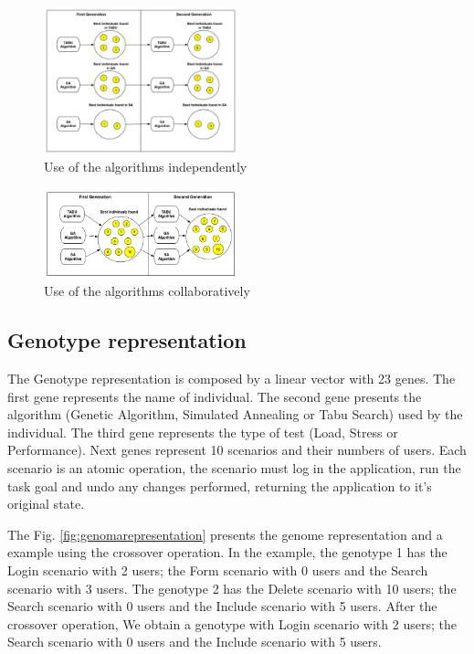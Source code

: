 \begin{figure}[h]
\includegraphics[width=0.5\textwidth]{./images/independ.png}
\caption{Use of the algorithms independently}
\label{fig:firstaproach}
\end{figure}
\begin{figure}
\includegraphics[width=0.5\textwidth]{./images/collaborative.png}
\caption{Use of the  algorithms collaboratively}
\label{fig:secondapproach}
\end{figure}

\subsection{Genotype representation}

The Genotype representation is composed by a linear vector with 23 genes. The first gene represents the name of individual. The second gene presents the  algorithm (Genetic Algorithm, Simulated Annealing or Tabu Search) used by the individual. The third gene represents the type of test (Load, Stress or Performance). Next genes represent 10 scenarios and their numbers of users. Each scenario is an atomic operation, the scenario must log in the application, run the task goal and undo any changes performed, returning the application to it's original state. 

The Fig. \ref{fig:genomarepresentation} presents the genome representation and  a example using the crossover operation. In the example, the genotype 1 has the Login scenario with 2 users; the Form scenario with 0 users and the Search scenario with 3 users. The genotype 2 has the Delete scenario with 10 users; the Search scenario with 0 users and the Include scenario with 5 users. After the crossover operation, We obtain a genotype with  Login scenario with 2 users; the Search scenario with 0 users and the Include scenario with 5 users.

